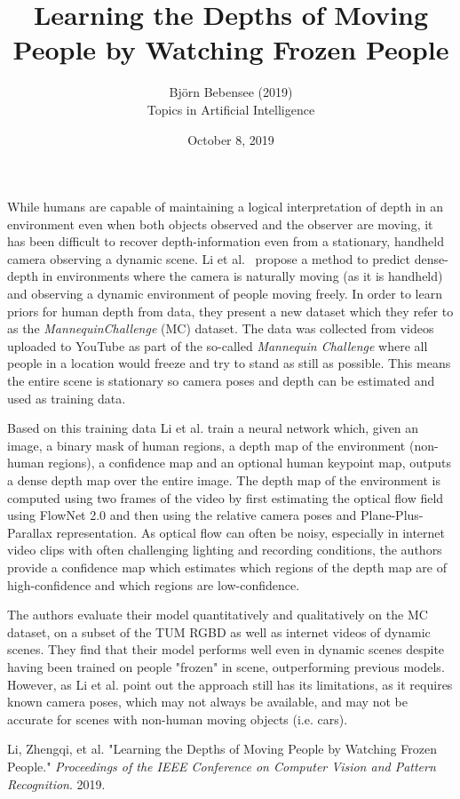 \documentclass[12pt]{article}
\begin{document}
 
 
\title{Learning the Depths of Moving People by Watching Frozen People}
\author{Bj\"orn Bebensee (2019)\\ %
Topics in Artificial Intelligence}
\date{October 8, 2019}
\maketitle

\noindent
While humans are capable of maintaining a logical interpretation of depth in an environment even when both objects observed and the observer are moving, it has been difficult to recover depth-information even from a stationary, handheld camera observing a dynamic scene. Li et al.~\cite{li} propose a method to predict dense-depth in environments where the camera is naturally moving (as it is handheld) and observing a dynamic environment of people moving freely. In order to learn priors for human depth from data, they present a new dataset which they refer to as the \emph{MannequinChallenge} (MC) dataset. The data was collected from videos uploaded to YouTube as part of the so-called \emph{Mannequin Challenge} where all people in a location would freeze and try to stand as still as possible. This means the entire scene is stationary so camera poses and depth can be estimated and used as training data.

Based on this training data Li et al. train a neural network which, given an image, a binary mask of human regions, a depth map of the environment (non-human regions), a confidence map and an optional human keypoint map, outputs a dense depth map over the entire image. The depth map of the environment is computed using two frames of the video by first estimating the optical flow field using FlowNet 2.0 and then using the relative camera poses and Plane-Plus-Parallax representation. As optical flow can often be noisy, especially in internet video clips with often challenging lighting and recording conditions, the authors provide a confidence map which estimates which regions of the depth map are of high-confidence and which regions are low-confidence.

The authors evaluate their model quantitatively and qualitatively on the MC dataset, on a subset of the TUM RGBD as well as internet videos of dynamic scenes. They find that their model performs well even in dynamic scenes despite having been trained on people "frozen" in scene, outperforming previous models. However, as Li et al. point out the approach still has its limitations, as it requires known camera poses, which may not always be available, and may not be accurate for scenes with non-human moving objects (i.e. cars).




\begin{thebibliography}{9}
Li, Zhengqi, et al. "Learning the Depths of Moving People by Watching Frozen People." \emph{Proceedings of the IEEE Conference on Computer Vision and Pattern Recognition}. 2019.

\end{thebibliography}
 
\end{document}
